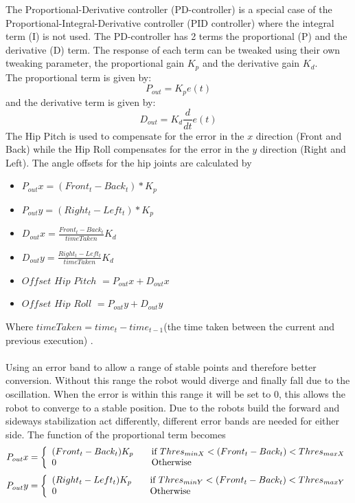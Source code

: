 \documentclass[a4paper]{article}
\begin{document}
The Proportional-Derivative controller (PD-controller) is a special case of the
Proportional-Integral-Derivative controller (PID controller) where the integral
term (I) is not used.  The PD-controller has 2 terms the proportional (P) and
the derivative (D) term. The response of each term can be tweaked using their own tweaking parameter, the proportional gain $K_p$ and the derivative gain $K_d$. \\
The proportional term is given by:
\[
P_{out}  = K_pe(t)
 \]
and the derivative term is given by:
\[
D_{out}  = K_d\frac{d}{dt}e(t)
\]
The Hip Pitch is used to compensate for the error in the $x$ direction (Front
and Back) while the Hip Roll compensates for the error in the $y$ direction (Right and Left).
The angle offsets for the hip joints are calculated by
\begin{itemize}
    \item $P_{out} x = (Front_t - Back_t) * K_p$
    \item $P_{out} y = (Right_t - Left_t) * K_p$
    \item $D_{out} x = \frac{Front_t - Back_t}{timeTaken}K_d$
    \item $D_{out} y = \frac{Right_t - Left_t}{timeTaken}K_d$
    \item  $Offset$ $Hip$ $Pitch$ $= P_{out}x + D_{out}x$ 
    \item $Offset$ $Hip$ $Roll$ $=  P_{out}y + D_{out}y$ 
\end{itemize}
Where $timeTaken = time_t - time_{t-1}$(the time taken between the current and previous execution) .\\\\
Using an error band to allow a range of stable points and therefore better
conversion. Without this range the robot would diverge and finally fall due to
the oscillation. When the error is within this range it will be set to 0, this
allows the robot to converge to a stable position. Due to the robots build the
forward and sideways stabilization act differently, different error bands are
needed for either side. The function of the proportional term becomes
\[
  P_{out}x = \left\{ 
  \begin{array}{l l}
     (Front_t - Back_t)K_p& \quad \text{if $Thres_{min X} < (Front_t - Back_t) < Thres_{max X}$}\\ 
     0& \quad \text{Otherwise}\\
  \end{array} \right.
\]
\[
  P_{out}y = \left\{ 
  \begin{array}{l l}
     (Right_t - Left_t)K_p& \quad \text{if $Thres_{min Y} < (Front_t - Back_t) < Thres_{max Y}$}\\ 
     0& \quad \text{Otherwise}\\
  \end{array} \right.
\]
\end{document}
